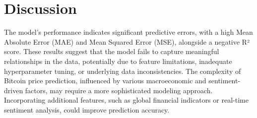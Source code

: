 \section{Discussion}\label{sec:discussion}

The model's performance indicates significant predictive errors, with a high Mean Absolute Error
(MAE) and Mean Squared Error (MSE), alongside a negative R² score. These results suggest that the
model fails to capture meaningful relationships in the data, potentially due to feature limitations,
inadequate hyperparameter tuning, or underlying data inconsistencies. The complexity of Bitcoin
price prediction, influenced by various macroeconomic and sentiment-driven factors, may require a
more sophisticated modeling approach. Incorporating additional features, such as global financial
indicators or real-time sentiment analysis, could improve prediction accuracy.